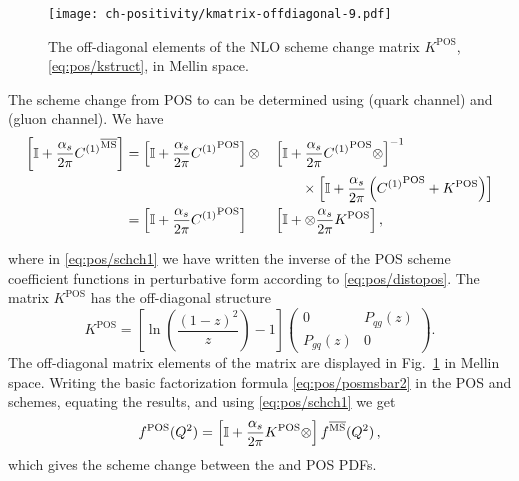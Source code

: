 \begin{figure}[t]
  \begin{center}
    \texttt{[image: ch-positivity/kmatrix-offdiagonal-9.pdf]}
    \caption{\small The off-diagonal  elements of the NLO scheme
      change matrix $K^{\textrm{POS}}$, \cref{eq:pos/kstruct}, in Mellin space.
    \label{fig:kmat} }
  \end{center}
\end{figure}
The scheme change from POS to \msbar{} can be determined using
 (quark channel) and
 (gluon channel).
We have
\begin{alignat}{2}
  \label{eq:pos/schch0}
\left[\mathbb{I}
+\frac{\alpha_s}{2\pi} {C^{(1)}}^{{\overline{\textrm{MS}}}}\right]&=
  \left[\mathbb{I} +\frac{\alpha_s}{2\pi} {C^{(1)}}^{\textrm{POS}}\right]\otimes
  &&\left[\mathbb{I} + \frac{\alpha_s}{2\pi} {C^{(1)}}^{\textrm{POS}}\otimes\right]^{-1}
  \nonumber\\
  & &&\qquad\times\left[\mathbb{I} +\frac{\alpha_s}{2\pi}  
    \left({C^{(1)}}^{\textrm{POS}} + K^{\textrm{POS}} \right)
  \right]\\
&=\left[\mathbb{I}
  +\frac{\alpha_s}{2\pi} {C^{(1)}}^{\textrm{POS}}
  \right]
  &&\left[\mathbb{I} + \otimes \frac{\alpha_s}{2\pi}  K^{\textrm{POS}}\right]
  , \label{eq:pos/schch1}
\end{alignat}

where in \cref{eq:pos/schch1} we have written the inverse of the
POS scheme coefficient functions in perturbative form according to
\cref{eq:pos/distopos}. The matrix  $K^{\textrm{POS}}$ has the
off-diagonal structure
\begin{equation}\label{eq:pos/kstruct}
  K^{\textrm{POS}}=\left[\ln\left(\frac{(1-z)^2}{z}\right) - 1\right]
  \left(\begin{array}{cc} 0 & P_{qg}(z) \\
  P_{gq}(z) & 0\end{array}\right).
\end{equation}
The off-diagonal matrix elements of the matrix are displayed in
Fig.~\ref{fig:kmat} in Mellin space. 
Writing the basic factorization formula \cref{eq:pos/posmsbar2} in
the POS and \msbar{} schemes, equating the results, and using
\cref{eq:pos/schch1} we get
\begin{align}
  \label{eq:pos/schch}
 f^{\textrm{POS}}(Q^2)=\left[\mathbb{I}
  +\frac{\alpha_s}{2\pi}  K^{\textrm{POS}}\otimes\right] f^{{\overline{\textrm{MS}}}}(Q^2)\,,
\end{align}
which gives the scheme change between the \msbar{} and POS PDFs. 

